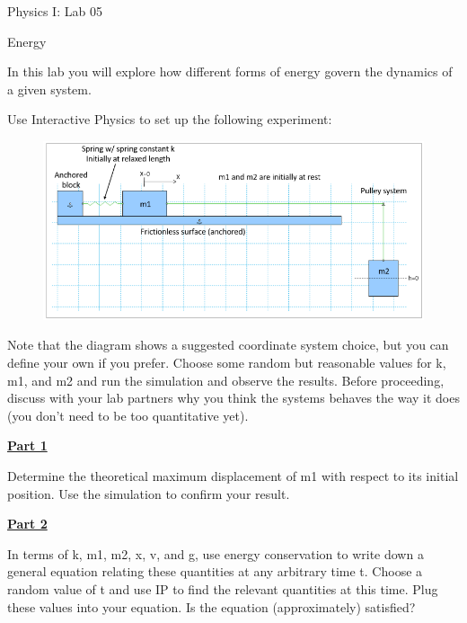 \documentclass[12pt]{article}
\begin{document}
{\centering
\large Physics I: Lab 05 \par
\large Energy \par
}
\hfill \break \vspace{-4mm}

In this lab you will explore how different forms of energy govern the dynamics of a given system.

Use Interactive Physics to set up the following experiment:
%
\begin{figure}[H]
\includegraphics[scale=0.70]{figures/fig1.png}
\end{figure}
%
Note that the diagram shows a suggested coordinate system choice, but you can define your own if you prefer.
Choose some random but reasonable values for k, m1, and m2 and run the simulation and observe the results.
Before proceeding, discuss with your lab partners why you think the systems behaves the way it does (you don't need to be too quantitative yet).

\underline{\textbf{Part 1}} \par
Determine the theoretical maximum displacement of m1 with respect to its initial position.
Use the simulation to confirm your result.

\underline{\textbf{Part 2}} \par
In terms of k, m1, m2, x, v, and g, use energy conservation to write down a general equation relating these quantities at any arbitrary time t.
Choose a random value of t and use IP to find the relevant quantities at this time.
Plug these values into your equation.
Is the equation (approximately) satisfied?
\end{document}
